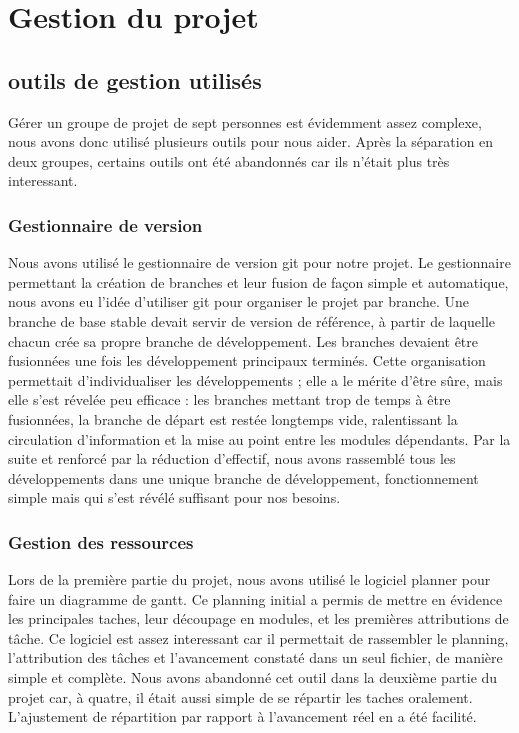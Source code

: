 \chapter{Gestion du projet}

\section{outils de gestion utilisés}

Gérer un groupe de projet de sept personnes est évidemment assez complexe, nous avons donc utilisé plusieurs outils pour nous aider. Après la séparation en deux groupes, certains outils ont été abandonnés car ils n'était plus très interessant.

\subsection{Gestionnaire de version}

Nous avons utilisé le gestionnaire de version git pour notre projet. Le gestionnaire permettant la création de branches et leur fusion de façon simple et automatique, nous avons eu l'idée d'utiliser git pour organiser le projet par branche. Une branche de base stable devait servir de version de référence, à partir de laquelle chacun crée sa propre branche de développement. Les branches devaient être fusionnées une fois les développement principaux terminés. Cette organisation permettait d'individualiser les développements ; elle a le mérite d'être sûre, mais elle s'est révelée peu efficace : les branches mettant trop de temps à être fusionnées, la branche de départ est restée longtemps vide, ralentissant la circulation d'information et la mise au point entre les modules dépendants. Par la suite et renforcé par la réduction d'effectif, nous avons rassemblé tous les développements dans une unique branche de développement, fonctionnement simple mais qui s'est révélé suffisant pour nos besoins. 

\subsection{Gestion des ressources}

Lors de la première partie du projet, nous avons utilisé le logiciel planner pour faire un diagramme de gantt. Ce planning initial a permis de mettre en évidence les principales taches, leur découpage en modules, et les premières attributions de tâche. Ce logiciel est assez interessant car il permettait de rassembler le planning, l'attribution des tâches et l'avancement constaté dans un seul fichier, de manière simple et complète. 
Nous avons abandonné cet outil dans la deuxième partie du projet car, à quatre, il était aussi simple de se répartir les taches oralement. L'ajustement de répartition par rapport à l'avancement réel en a été facilité.

